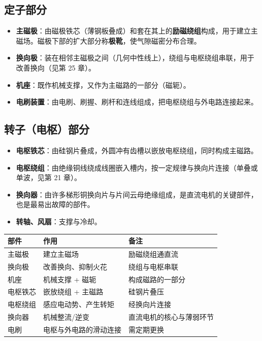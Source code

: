 \subsection{定子部分}
\begin{itemize}
  \item \textbf{主磁极}：由磁极铁芯（薄钢板叠成）和套在其上的\textbf{励磁绕组}构成，用于建立主磁场。磁极下部的扩大部分称\textbf{极靴}，使气隙磁密分布合理。
  \item \textbf{换向极}：装在相邻主磁极之间（几何中性线上），绕组与电枢绕组串联，用于改善换向（见第 25 章）。
  \item \textbf{机座}：既作机械支撑，又作为主磁路的一部分（磁轭）。
  \item \textbf{电刷装置}：由电刷、刷握、刷杆和连线组成，把电枢绕组与外电路连接起来。
\end{itemize}

\subsection{转子（电枢）部分}
\begin{itemize}
  \item \textbf{电枢铁芯}：由硅钢片叠成，外圆冲有齿槽以嵌放电枢绕组，同时构成主磁路。
  \item \textbf{电枢绕组}：由绝缘铜线绕成线圈嵌入槽内，按一定规律与换向片连接（单叠或单波，见第 21 章）。
  \item \textbf{换向器}：由许多梯形铜换向片与片间云母绝缘组成，是直流电机的关键部件，也是最易出故障的部件。
  \item \textbf{转轴、风扇}：支撑与冷却。
\end{itemize}

\begin{center}
\begin{tabular}{@{}p{2.2cm}p{4.6cm}p{5.2cm}@{}}
\toprule
部件 & 作用 & 备注 \\
\midrule
主磁极 & 建立主磁场 & 励磁绕组通直流 \\
换向极 & 改善换向、抑制火花 & 绕组与电枢串联 \\
机座 & 机械支撑 + 磁轭 & 构成磁路的一部分 \\
电枢铁芯 & 嵌放绕组 + 主磁路 & 硅钢片叠压 \\
电枢绕组 & 感应电动势、产生转矩 & 经换向片连接 \\
换向器 & 机械整流/逆变 & 直流电机的核心与薄弱环节 \\
电刷 & 电枢与外电路的滑动连接 & 需定期更换 \\
\bottomrule
\end{tabular}
\end{center}

